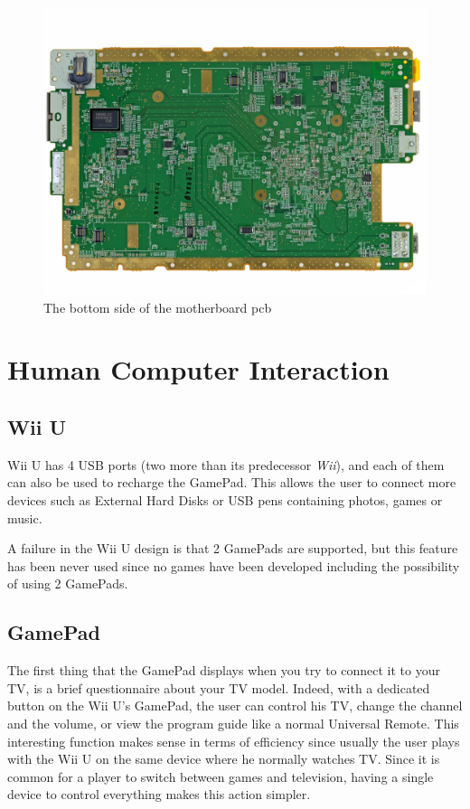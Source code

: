 \documentclass[11pt,a4paper,titlepage]{article}
\begin{document}
				\begin{figure}[htbp]
				  \centering
				  \includegraphics[width = .8\textwidth]{motherboard_back.png}
				  \caption{The bottom side of the motherboard \gls{pcb}}
				  \label{fig:motherboard_bottom}
				\end{figure}

	\section{Human Computer Interaction}
		\subsection{Wii U}
			Wii U has 4 USB ports (two more than its predecessor \textit{Wii}), and each of them can also be used to recharge the GamePad. This allows the user to connect more devices such as External Hard Disks or USB pens containing photos, games or music.

			A failure in the Wii U design is that 2 GamePads are supported, but this feature has been never used since no games have been developed including the possibility of using 2 GamePads.
		\subsection{GamePad}
			The first thing that the GamePad displays when you try to connect it to your TV, is a brief questionnaire about your TV model.
			Indeed, with a dedicated button on the Wii U's GamePad, the user can control his TV, change the channel and the volume, or view the program guide like a normal Universal Remote.
			This interesting function makes sense in terms of efficiency since usually the user plays with the Wii U on the same device where he normally watches TV. Since it is common for a player to switch between games and television, having a single device to control everything makes this action simpler.
\end{document}
